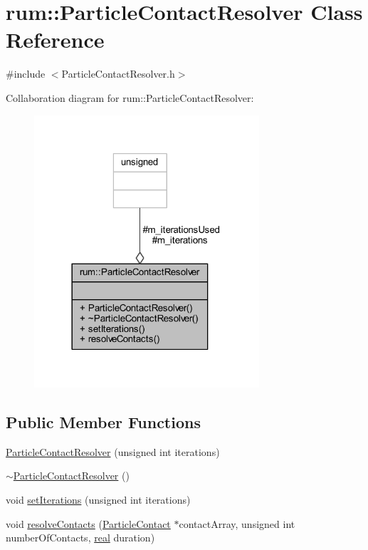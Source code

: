 \hypertarget{classrum_1_1_particle_contact_resolver}{}\section{rum\+:\+:Particle\+Contact\+Resolver Class Reference}
\label{classrum_1_1_particle_contact_resolver}


{\ttfamily \#include $<$Particle\+Contact\+Resolver.\+h$>$}



Collaboration diagram for rum\+:\+:Particle\+Contact\+Resolver\+:\nopagebreak
\begin{figure}[H]
\begin{center}
\leavevmode
\includegraphics[width=237pt]{classrum_1_1_particle_contact_resolver__coll__graph}
\end{center}
\end{figure}
\subsection*{Public Member Functions}
\begin{DoxyCompactItemize}
\item 
\mbox{\hyperlink{classrum_1_1_particle_contact_resolver_a1921a5520c8940065d04f3bb890680bc}{Particle\+Contact\+Resolver}} (unsigned int iterations)
\item 
\mbox{\hyperlink{classrum_1_1_particle_contact_resolver_aa87e6c4d5a737b9882969350c99505b9}{$\sim$\+Particle\+Contact\+Resolver}} ()
\item 
void \mbox{\hyperlink{classrum_1_1_particle_contact_resolver_ad713c38f5928fd75b31efc7acbaf924c}{set\+Iterations}} (unsigned int iterations)
\item 
void \mbox{\hyperlink{classrum_1_1_particle_contact_resolver_a670f0bd7f3ad2840e3c3c6cbb4e15b96}{resolve\+Contacts}} (\mbox{\hyperlink{classrum_1_1_particle_contact}{Particle\+Contact}} $\ast$contact\+Array, unsigned int number\+Of\+Contacts, \mbox{\hyperlink{namespacerum_a7e8cca23573d5eaead0f138cbaa4862c}{real}} duration)
\end{DoxyCompactItemize}
